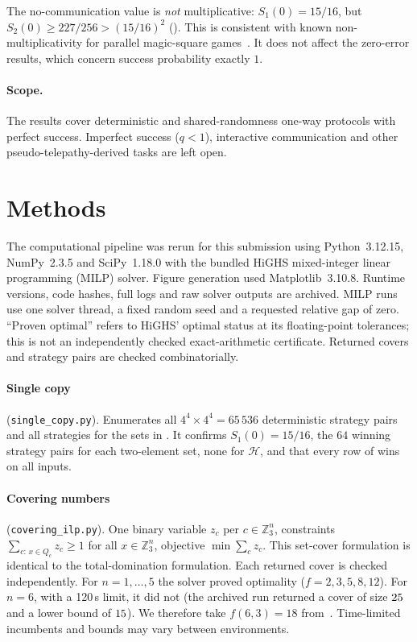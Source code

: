 \documentclass[12pt,a4paper]{article}
\theoremstyle{definition}
\theoremstyle{remark}
\newcommand{\Z}{\mathbb{Z}}
\newcommand{\Hd}{\mathcal{H}}   %
\begin{document}
The no-communication value is \emph{not} multiplicative: $S_1(0)=15/16$, but $S_2(0)\ge227/256>(15/16)^2$ (). This is consistent with known non-multiplicativity for parallel magic-square games~\cite{marton2024}. It does not affect the zero-error results, which concern success probability exactly $1$.

\paragraph{Scope.} The results cover deterministic and shared-randomness one-way protocols with perfect success. Imperfect success ($q<1$), interactive communication and other pseudo-telepathy-derived tasks are left open.

\section{Methods}
\label{sec:methods}

The computational pipeline was rerun for this submission using Python~3.12.15, NumPy~2.3.5 and SciPy~1.18.0 with the bundled HiGHS mixed-integer linear programming (MILP) solver. Figure generation used Matplotlib~3.10.8. Runtime versions, code hashes, full logs and raw solver outputs are archived. MILP runs use one solver thread, a fixed random seed and a requested relative gap of zero. ``Proven optimal'' refers to HiGHS' optimal status at its floating-point tolerances; this is not an independently checked exact-arithmetic certificate. Returned covers and strategy pairs are checked combinatorially.

\paragraph{Single copy} (\texttt{single\_copy.py}). Enumerates all $4^4\times4^4=65\,536$ deterministic strategy pairs and all strategies for the sets in . It confirms $S_1(0)=15/16$, the $64$ winning strategy pairs for each two-element set, none for $\Hd$, and that every row of  wins on all inputs.

\paragraph{Covering numbers} (\texttt{covering\_ilp.py}). One binary variable $z_c$ per $c\in\Z_3^n$, constraints $\sum_{c:\,x\in Q_c}z_c\ge1$ for all $x\in\Z_3^n$, objective $\min\sum_c z_c$. This set-cover formulation is identical to the total-domination formulation. Each returned cover is checked independently. For $n=1,\dots,5$ the solver proved optimality ($f=2,3,5,8,12$). For $n=6$, with a 120\,s limit, it did not (the archived run returned a cover of size $25$ and a lower bound of $15$). We therefore take $f(6,3)=18$ from~\cite{adriaensen2026}. Time-limited incumbents and bounds may vary between environments.
\end{document}
